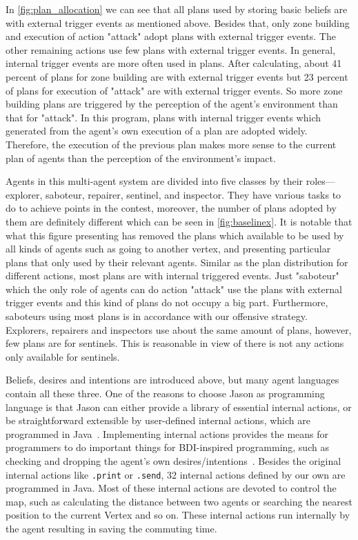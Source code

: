 In \autoref{fig:plan_allocation} we can see that all plans used by storing basic beliefs are with external trigger events as mentioned above.
Besides that, only zone building and execution of action "attack" adopt plans with external trigger events.
The other remaining actions use few plans with external trigger events.
In general, internal trigger events are more often used in plans.
After calculating, about 41 percent of plans for zone building are with external trigger events but 23 percent of plans for execution of "attack" are with external trigger events.
So more zone building plans are triggered by the perception of the agent's environment than that for "attack".
In this program, plans with internal trigger events which generated from the agent's own execution of a plan are adopted widely.
Therefore, the execution of the previous plan makes more sense to the current plan of agents than the perception of the environment's impact.

Agents in this multi-agent system are divided into five classes by their roles---explorer, saboteur, repairer, sentinel, and inspector.
They have various tasks to do to achieve points in the contest, moreover, the number of plans adopted by them are definitely different which can be seen in \autoref{fig:baselinex}.
It is notable that what this figure presenting has removed the plans which available to be used by all kinds of agents such as going to another vertex, and presenting particular plans that only used by their relevant agents.
Similar as the plan distribution for different actions, most plans are with internal triggered events.
Just "saboteur" which the only role of agents can do action "attack" use the plans with external trigger events and this kind of plans do not occupy a big part.
Furthermore, saboteurs using most plans is in accordance with our offensive strategy.
Explorers, repairers and inspectors use about the same amount of plans, however, few plans are for sentinels.
This is reasonable in view of there is not any actions only available for sentinels.

Beliefs, desires and intentions are introduced above, but many agent languages contain all these three.
One of the reasons to choose Jason as programming language is that Jason can either provide a library of essential internal actions, or be straightforward extensible by user-defined internal actions, which are programmed in Java~\cite{rafael_Javabased_2007}.
Implementing internal actions provides the means for programmers to do important things for BDI-inspired programming, such as checking and dropping the agent's own
desires/intentions~\cite{rafael_overviewjason_2006}.
Besides the original internal actions like \texttt{.print} or \texttt{.send}, 32 internal actions defined by our own are programmed in Java.
Most of these internal actions are devoted to control the map, such as calculating the distance between two agents or searching the nearest position to the current Vertex and so on.
These internal actions run internally by the agent resulting in saving the commuting time.

